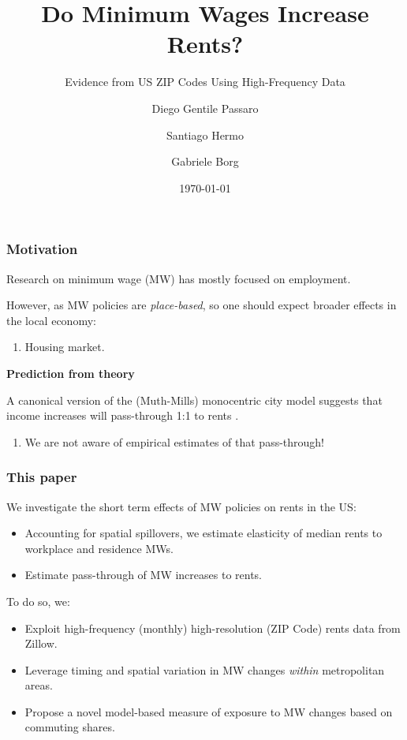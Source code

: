 \documentclass[aspectratio=169, t]{beamer}
\title{Do Minimum Wages Increase Rents?}
\subtitle{Evidence from US ZIP Codes Using High-Frequency Data}
\date{\today}
\author{Diego Gentile Passaro \and Santiago Hermo \and Gabriele Borg}
\institute{Brown University $ \quad\quad\quad\quad $ Brown University $ \quad\quad\quad\quad$  AWS}
\begin{document}
\maketitle



\begin{frame}
	\frametitle{Motivation}
	
	Research on minimum wage (MW) has mostly focused on employment.
	
	\vspace{1.5mm}

	However, as MW policies are \textit{place-based}, so one should expect broader effects 
	in the local economy:
	\begin{enumerate}[$\Rightarrow$]
		\item Housing market.
	\end{enumerate}

	\pause
	\vspace{3mm}
	\textbf{Prediction from theory}
	
    A canonical version of the (Muth-Mills) monocentric city model suggests that income increases will 
    pass-through 1:1 to rents \parencite{Brueckner1987}.  
    \begin{enumerate}[$\Rightarrow $]
		\item We are not aware of empirical estimates of that pass-through!
	\end{enumerate}
\end{frame}

\begin{frame}
	\frametitle{This paper}
	We investigate the short term effects of MW policies on rents in the US:
	\begin{itemize}
		\vspace{.5mm} \item Accounting for spatial spillovers, we estimate 
		elasticity of median rents to workplace and residence MWs.
		\vspace{.5mm} \item Estimate pass-through of MW increases to rents.
	\end{itemize}
	
	\vspace{3mm}
	\pause
	To do so, we:
	\begin{itemize}
    	\vspace{.5mm} \item Exploit high-frequency (monthly) high-resolution 
    	(ZIP Code) rents data from Zillow.
    	\vspace{.5mm} \item Leverage timing and spatial variation in MW changes 
    	\textit{within} metropolitan areas.
    	\vspace{.5mm} \item Propose a novel model-based measure of exposure to MW changes based on 
    	commuting shares.
	\end{itemize}
\end{frame}
\end{document}
